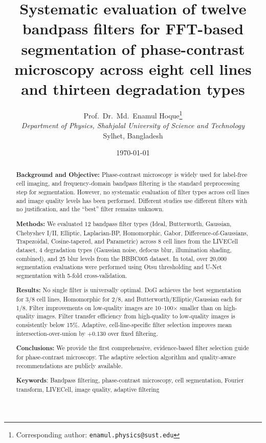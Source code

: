 \documentclass[11pt,a4paper]{article}
\title{\textbf{Systematic evaluation of twelve bandpass filters for FFT-based segmentation of phase-contrast microscopy across eight cell lines and thirteen degradation types}}
\author{
Prof.~Dr.~Md.~Enamul Hoque\thanks{Corresponding author: \texttt{enamul.physics@sust.edu}} \\
\textit{Department of Physics, Shahjalal University of Science and Technology} \\
Sylhet, Bangladesh
}
\date{\today}
\begin{document}
\maketitle

\begin{abstract}
\textbf{Background and Objective:} Phase-contrast microscopy is widely used for label-free cell imaging, and frequency-domain bandpass filtering is the standard preprocessing step for segmentation. However, no systematic evaluation of filter types across cell lines and image quality levels has been performed. Different studies use different filters with no justification, and the ``best'' filter remains unknown.

\textbf{Methods:} We evaluated 12 bandpass filter types (Ideal, Butterworth, Gaussian, Chebyshev I/II, Elliptic, Laplacian-BP, Homomorphic, Gabor, Difference-of-Gaussians, Trapezoidal, Cosine-tapered, and Parametric) across 8 cell lines from the LIVECell dataset, 4 degradation types (Gaussian noise, defocus blur, illumination shading, combined), and 25 blur levels from the BBBC005 dataset. In total, over 20,000 segmentation evaluations were performed using Otsu thresholding and U-Net segmentation with 5-fold cross-validation.

\textbf{Results:} No single filter is universally optimal. DoG achieves the best segmentation for 3/8 cell lines, Homomorphic for 2/8, and Butterworth/Elliptic/Gaussian each for 1/8. Filter improvements on low-quality images are 10--100$\times$ smaller than on high-quality images. Filter transfer efficiency from high-quality to low-quality images is consistently below 15\%. Adaptive, cell-line-specific filter selection improves mean intersection-over-union by $+0.130$ over fixed filtering.

\textbf{Conclusions:} We provide the first comprehensive, evidence-based filter selection guide for phase-contrast microscopy. The adaptive selection algorithm and quality-aware recommendations are publicly available.

\textbf{Keywords}: Bandpass filtering, phase-contrast microscopy, cell segmentation, Fourier transform, LIVECell, image quality, adaptive filtering
\end{abstract}

\end{document}

